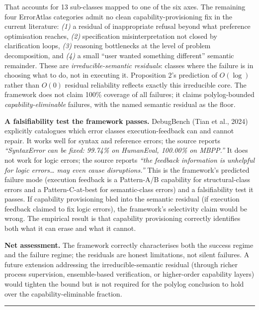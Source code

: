 \documentclass[
]{article}
\begin{document}
That accounts for 13 sub-classes mapped to one of the six axes. The
remaining four ErrorAtlas categories admit no clean
capability-provisioning fix in the current literature: \emph{(1)} a
residual of inappropriate refusal beyond what preference optimisation
reaches, \emph{(2)} specification misinterpretation not closed by
clarification loops, \emph{(3)} reasoning bottlenecks at the level of
problem decomposition, and \emph{(4)} a small ``user wanted something
different'' semantic remainder. These are \emph{irreducible-semantic
residuals}: classes where the failure is in choosing what to do, not in
executing it. Proposition 2's prediction of \(O(\log)\) rather than
\(O(0)\) residual reliability reflects exactly this irreducible core.
The framework does not claim 100\% coverage of all failures; it claims
polylog-bounded \emph{capability-eliminable} failures, with the named
semantic residual as the floor.

\textbf{A falsifiability test the framework passes.} DebugBench (Tian et
al., 2024) explicitly catalogues which error classes execution-feedback
can and cannot repair. It works well for syntax and reference errors;
the source reports \emph{``SyntaxError can be fixed: 99.74\% on
HumanEval, 100.00\% on MBPP.''} It does not work for logic errors; the
source reports \emph{``the feedback information is unhelpful for logic
errors\ldots{} may even cause disruptions.''} This is the framework's
predicted failure mode (execution feedback is a Pattern-A/B capability
for structural-class errors and a Pattern-C-at-best for semantic-class
errors) and a falsifiability test it passes. If capability provisioning
bled into the semantic residual (if execution feedback claimed to fix
logic errors), the framework's selectivity claim would be wrong. The
empirical result is that capability provisioning correctly identifies
both what it can erase and what it cannot.

\textbf{Net assessment.} The framework correctly characterises both the
success regime and the failure regime; the residuals are honest
limitations, not silent failures. A future extension addressing the
irreducible-semantic residual (through richer process supervision,
ensemble-based verification, or higher-order capability layers) would
tighten the bound but is not required for the polylog conclusion to hold
over the capability-eliminable fraction.

\begin{center}\rule{0.5\linewidth}{0.5pt}\end{center}
\end{document}
